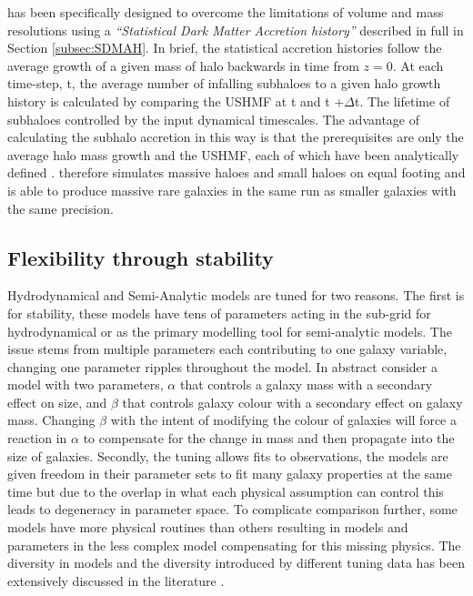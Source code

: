 \steel has been specifically designed to overcome the limitations of volume and mass resolutions using a \textit{``Statistical Dark Matter Accretion history''} described in full in Section \ref{subsec:SDMAH}. In brief, the statistical accretion histories follow the average growth of a given mass of halo backwards in time from $z = 0$. At each time-step, t, the average number of infalling subhaloes to a given halo growth history is calculated by comparing the USHMF at t and t +$\Delta$t. The lifetime of subhaloes controlled by the input dynamical timescales. The advantage of calculating the subhalo accretion in this way is that the prerequisites are only the average halo mass growth and the USHMF, each of which have been analytically defined \cite{vandenBosch2014ComingWells, Jiang2016StatisticsFunctions}.
\steel therefore simulates massive haloes and small haloes on equal footing and is able to produce massive rare galaxies in the same run as smaller galaxies with the same precision.

\subsection{Flexibility through stability}
Hydrodynamical and Semi-Analytic models are tuned for two reasons. The first is for stability, these models have tens of parameters acting in the sub-grid for hydrodynamical or as the primary modelling tool for semi-analytic models. The issue stems from multiple parameters each contributing to one galaxy variable, changing one parameter ripples throughout the model. In abstract consider a model with two parameters, $\alpha$ that controls a galaxy mass with a secondary effect on size, and $\beta$ that controls galaxy colour with a secondary effect on galaxy mass. Changing $\beta$ with the intent of modifying the colour of galaxies will force a reaction in $\alpha$ to compensate for the change in mass and then propagate into the size of galaxies. Secondly, the tuning allows fits to observations, the models are given freedom in their parameter sets to fit many galaxy properties at the same time but due to the overlap in what each physical assumption can control this leads to degeneracy in parameter space. To complicate comparison further, some models have more physical routines than others resulting in models and parameters in the less complex model compensating for this missing physics. The diversity in models and the diversity introduced by different tuning data has been extensively discussed in the literature \cite{Knebe2015NIFTyModels,Cui2018TheApplications,Knebe2018CosmicModels}.   

